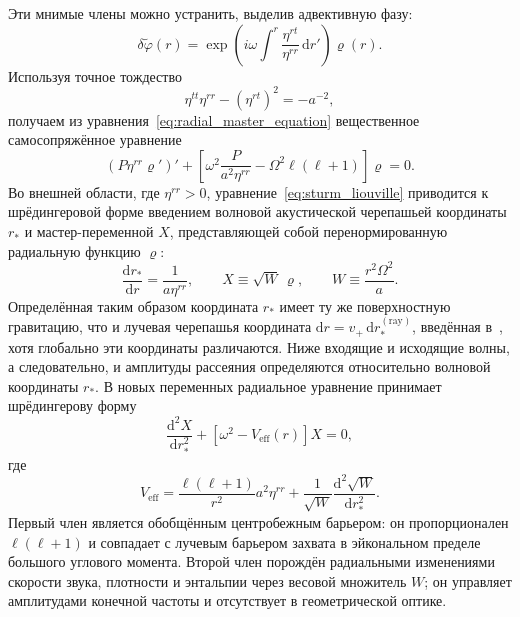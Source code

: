 \documentclass[12pt,a4paper,preprint,nopreprintline]{elsarticle}
\begin{document}
Эти мнимые члены можно устранить, выделив адвективную фазу:
\begin{equation}
    \delta\widetilde{\varphi}(r)=
    \exp\left(i\omega\int^{r}\frac{\eta^{rt}}{\eta^{rr}}\,\mathrm{d}r'\right)\varrho(r).
    \label{eq:phase_transformation}
\end{equation}
Используя точное тождество
\begin{equation}
    \eta^{tt}\eta^{rr}-(\eta^{rt})^{2}=-a^{-2},
    \label{eq:core_determinant}
\end{equation}
получаем из уравнения~\eqref{eq:radial_master_equation} вещественное самосопряжённое уравнение
\begin{equation}
    \left(P\eta^{rr}\varrho'\right)'
    +
    \left[
        \omega^{2}\frac{P}{a^{2}\eta^{rr}}
        -\Omega^{2}\ell(\ell+1)
    \right]\varrho=0.
    \label{eq:sturm_liouville}
\end{equation}
Во внешней области, где $\eta^{rr}>0$, уравнение~\eqref{eq:sturm_liouville} приводится к шрёдингеровой форме введением волновой акустической черепашьей координаты $r_{*}$ и мастер-переменной $X$, представляющей собой перенормированную радиальную функцию $\varrho$:
\begin{equation}
    \frac{\mathrm{d}r_{*}}{\mathrm{d}r}
    =
    \frac{1}{a\eta^{rr}},
    \qquad
    X\equiv\sqrt{W}\,\varrho,
    \qquad
    W\equiv\frac{r^{2}\Omega^{2}}{a}.
    \label{eq:tortoise_rescaling}
\end{equation}
Определённая таким образом координата $r_{*}$ имеет ту же поверхностную гравитацию, что и лучевая черепашья координата $\mathrm{d}r=v_{+}\,\mathrm{d}r_{*}^{\mathrm{(ray)}}$, введённая в~\cite{SemyannikovAV_AcousticGeometryAndSoundRayDynamics_2026}, хотя глобально эти координаты различаются. Ниже входящие и исходящие волны, а следовательно, и амплитуды рассеяния определяются относительно волновой координаты $r_{*}$. В новых переменных радиальное уравнение принимает шрёдингерову форму
\begin{equation}
    \frac{\mathrm{d}^{2}X}{\mathrm{d}r_{*}^{2}}
    +
    \left[\omega^{2}-V_{\mathrm{eff}}(r)\right]X=0,
    \label{eq:schrodinger_equation}
\end{equation}
где
\begin{equation}
    V_{\mathrm{eff}}
    =
    \frac{\ell(\ell+1)}{r^{2}}a^{2}\eta^{rr}
    +
    \frac{1}{\sqrt{W}}
    \frac{\mathrm{d}^{2}\sqrt{W}}{\mathrm{d}r_{*}^{2}}.
    \label{eq:effective_potential}
\end{equation}
Первый член является обобщённым центробежным барьером: он пропорционален $\ell(\ell+1)$ и совпадает с лучевым барьером захвата в эйкональном пределе большого углового момента. Второй член порождён радиальными изменениями скорости звука, плотности и энтальпии через весовой множитель $W$; он управляет амплитудами конечной частоты и отсутствует в геометрической оптике.
\end{document}
